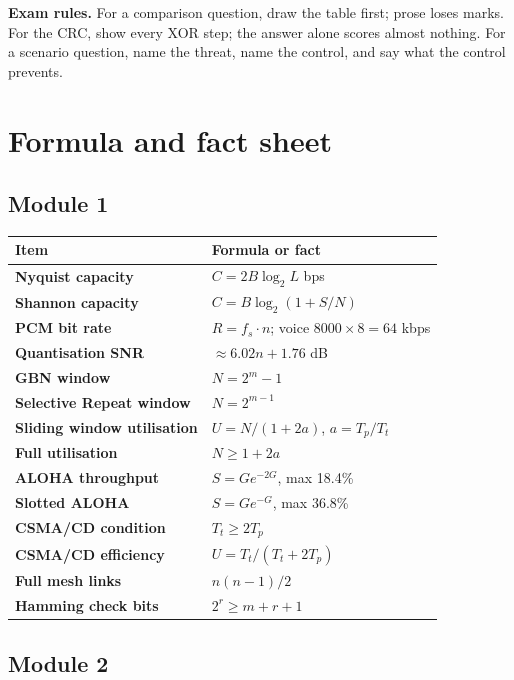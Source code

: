 \documentclass[11pt,a4paper]{article}
\begin{document}
\begin{exambox}
\textbf{Exam rules.} For a comparison question, draw the table first; prose loses marks. For the CRC, show every XOR step; the answer alone scores almost nothing. For a scenario question, name the threat, name the control, and say what the control prevents.
\end{exambox}

\section{Formula and fact sheet}

\subsection{Module 1}

\begin{center}\small
\begin{tabularx}{\textwidth}{>{\bfseries}p{} X}
\toprule Item & Formula or fact\\
\midrule
Nyquist capacity & $C = 2B\log_2 L$ bps\\
Shannon capacity & $C = B\log_2(1 + S/N)$\\
PCM bit rate & $R = f_s \cdot n$; voice $8000 \times 8 = 64$ kbps\\
Quantisation SNR & $\approx 6.02n + 1.76$ dB\\
GBN window & $N = 2^m - 1$\\
Selective Repeat window & $N = 2^{m-1}$\\
Sliding window utilisation & $U = N/(1+2a)$, $a = T_p/T_t$\\
Full utilisation & $N \ge 1 + 2a$\\
ALOHA throughput & $S = Ge^{-2G}$, max 18.4\%\\
Slotted ALOHA & $S = Ge^{-G}$, max 36.8\%\\
CSMA/CD condition & $T_t \ge 2T_p$\\
CSMA/CD efficiency & $U = T_t/(T_t + 2T_p)$\\
Full mesh links & $n(n-1)/2$\\
Hamming check bits & $2^r \ge m + r + 1$\\
\bottomrule
\end{tabularx}
\end{center}

\subsection{Module 2}
\end{document}
